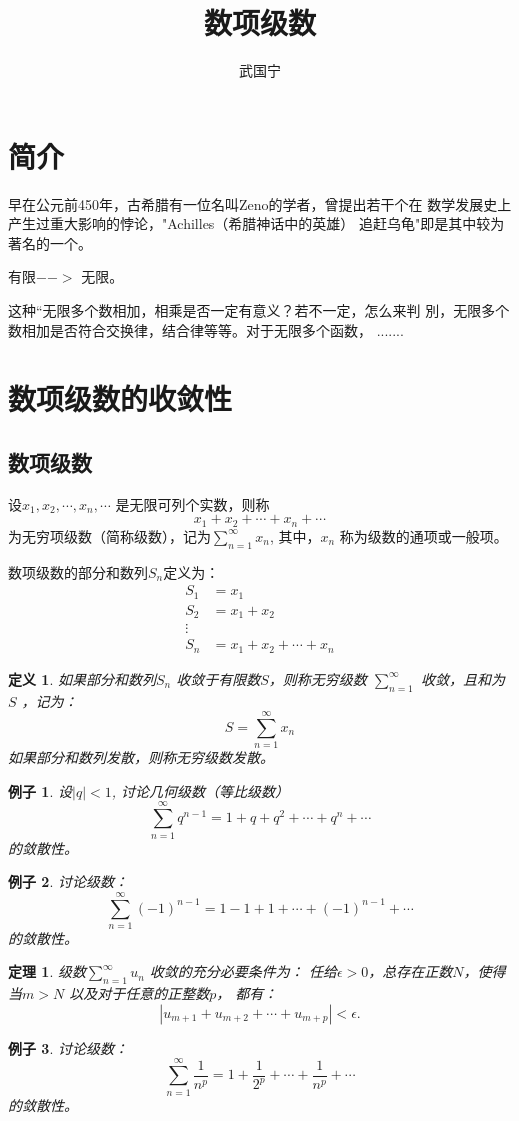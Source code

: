 \documentclass[a4paper,12pt]{article}
\newtheorem{theorem}{定理}
\newtheorem{definition}{定义}
\newtheorem{example}{例子}
\begin{document}
\title{数项级数}
\author{武国宁}
\date{}
\maketitle

\section{简介}
    早在公元前450年，古希腊有一位名叫Zeno的学者，曾提出若干个在
数学发展史上产生过重大影响的悖论，"Achilles（希腊神话中的英雄）
追赶乌龟"即是其中较为著名的一个。
    
    有限$-->$ 无限。
    
    这种“无限多个数相加，相乘是否一定有意义？若不一定，怎么来判
別，无限多个数相加是否符合交换律，结合律等等。对于无限多个函数，
.......

\section{数项级数的收敛性}
\subsection{数项级数}
    设$x_1, x_2, \cdots, x_n, \cdots$ 是无限可列个实数，则称
\[
        x_1 + x_2 + \cdots + x_n + \cdots
\]
为无穷项级数（简称级数），记为$\sum_{n=1}^{\infty} x_n$,
其中，$\displaystyle x_n$ 称为级数的通项或一般项。

    数项级数的部分和数列${S_n}$定义为：
\[
    \begin{split}
        S_1 &= x_1 \\
        S_2 &= x_1 + x_2 \\
    \vdots\\
        S_n &= x_1 + x_2 + \cdots + x_n
    \end{split}
    \]
\begin{definition}
    如果部分和数列${S_n}$ 收敛于有限数$S$，则称无穷级数
    $\displaystyle \sum_{n=1}^{\infty}$ 收敛，且和为$S$ ，记为：
    \[
        S = \sum_{n=1}^{\infty} x_n
        \]
    如果部分和数列发散，则称无穷级数发散。
\end{definition}
\begin{example}
    设$|q| < 1$, 讨论几何级数（等比级数）
    \[
        \sum_{n=1}^{\infty} q^{n-1} = 1 + q + q^2 + \cdots + q^n + \cdots
        \]
    的敛散性。
\end{example}
\begin{example}
    讨论级数：
    \[
        \sum_{n=1}^{\infty} (-1)^{n-1} = 1 - 1 + 1 + \cdots + 
        (-1)^{n-1} + \cdots
        \]
    的敛散性。
\end{example}
\begin{theorem}
    级数$\displaystyle \sum_{n=1}^{\infty} u_n$ 收敛的充分必要条件为：
    任给$\epsilon>0$，总存在正数$N$，使得当$m > N$ 以及对于任意的正整数$p$，
    都有：
    \[
        \left| u_{m+1} + u_{m+2} + \cdots + u_{m+p} \right| < \epsilon.
        \]
\end{theorem}
\begin{example}
    讨论级数：
    \[
        \sum_{n=1}^{\infty} \frac{1}{n^p} = 1 + \frac{1}{2^p} + \cdots + 
        \frac{1}{n^p} + \cdots
        \]
    的敛散性。
\end{example}
\end{document}
